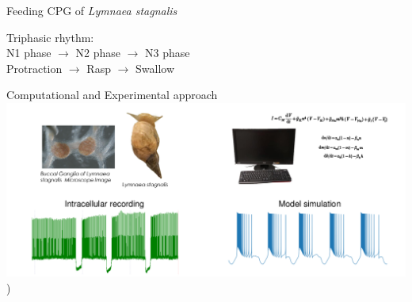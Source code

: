 \documentclass[aspectratio=43]{beamer}
\begin{document}
\begin{frame}{Feeding CPG of \textit{Lymnaea stagnalis}}

	Triphasic rhythm:
	\\
	\centering
	N1 phase $\rightarrow$ N2 phase $\rightarrow$ N3 phase \\
	Protraction $\rightarrow$ Rasp $\rightarrow$ Swallow\\
	\vspace{3pt}
	


\end{frame}



\begin{frame}{Computational and Experimental approach}
	\includegraphics[width=\textwidth]{Images/experimental-computational.pdf})
\end{frame}
\end{document}
